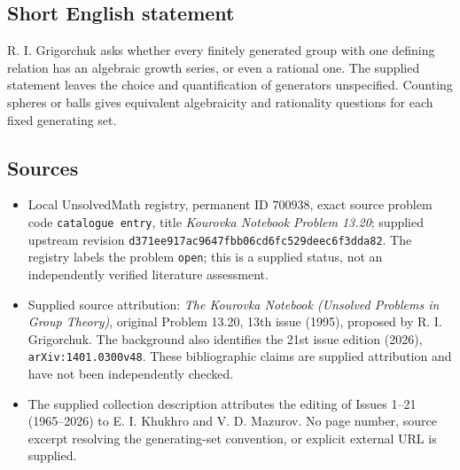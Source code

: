 \documentclass[11pt]{article}
\begin{document}
\subsection{Short English statement}
R. I. Grigorchuk asks whether every finitely generated group with one defining relation has an algebraic growth series, or even a rational one. The supplied statement leaves the choice and quantification of generators unspecified. Counting spheres or balls gives equivalent algebraicity and rationality questions for each fixed generating set.
\subsection{Sources}
\begin{itemize}
\item Local UnsolvedMath registry, permanent ID \(700938\), exact source problem code \texttt{catalogue entry}, title \emph{Kourovka Notebook Problem 13.20}; supplied upstream revision \texttt{d371ee917ac9647fbb06cd6fc529deec6f3dda82}. The registry labels the problem \texttt{open}; this is a supplied status, not an independently verified literature assessment.
\item Supplied source attribution: \emph{The Kourovka Notebook (Unsolved Problems in Group Theory)}, original Problem 13.20, 13th issue (1995), proposed by R. I. Grigorchuk. The background also identifies the 21st issue edition (2026), \texttt{arXiv:1401.0300v48}. These bibliographic claims are supplied attribution and have not been independently checked.
\item The supplied collection description attributes the editing of Issues 1--21 (1965--2026) to E. I. Khukhro and V. D. Mazurov. No page number, source excerpt resolving the generating-set convention, or explicit external URL is supplied.
\end{itemize}
\end{document}
